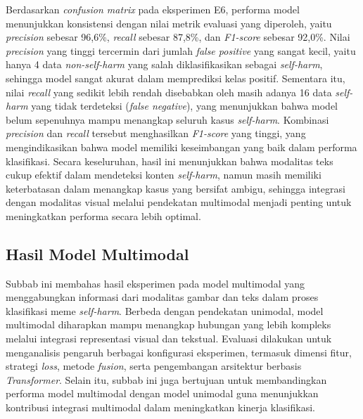 Berdasarkan \textit{confusion matrix} pada eksperimen E6, performa model menunjukkan konsistensi dengan nilai metrik evaluasi yang diperoleh, yaitu \textit{precision} sebesar 96,6\%, \textit{recall} sebesar 87,8\%, dan \textit{F1-score} sebesar 92,0\%. Nilai \textit{precision} yang tinggi tercermin dari jumlah \textit{false positive} yang sangat kecil, yaitu hanya 4 data \textit{non-self-harm} yang salah diklasifikasikan sebagai \textit{self-harm}, sehingga model sangat akurat dalam memprediksi kelas positif. Sementara itu, nilai \textit{recall} yang sedikit lebih rendah disebabkan oleh masih adanya 16 data \textit{self-harm} yang tidak terdeteksi (\textit{false negative}), yang menunjukkan bahwa model belum sepenuhnya mampu menangkap seluruh kasus \textit{self-harm}. Kombinasi \textit{precision} dan \textit{recall} tersebut menghasilkan \textit{F1-score} yang tinggi, yang mengindikasikan bahwa model memiliki keseimbangan yang baik dalam performa klasifikasi. Secara keseluruhan, hasil ini menunjukkan bahwa modalitas teks cukup efektif dalam mendeteksi konten \textit{self-harm}, namun masih memiliki keterbatasan dalam menangkap kasus yang bersifat ambigu, sehingga integrasi dengan modalitas visual melalui pendekatan multimodal menjadi penting untuk meningkatkan performa secara lebih optimal.





\subsection{Hasil Model Multimodal}
\label{IV.HasilMultimodal}
Subbab ini membahas hasil eksperimen pada model multimodal yang menggabungkan informasi dari modalitas gambar dan teks dalam proses klasifikasi meme \textit{self-harm}. Berbeda dengan pendekatan unimodal, model multimodal diharapkan mampu menangkap hubungan yang lebih kompleks melalui integrasi representasi visual dan tekstual. Evaluasi dilakukan untuk menganalisis pengaruh berbagai konfigurasi eksperimen, termasuk dimensi fitur, strategi \textit{loss}, metode \textit{fusion}, serta pengembangan arsitektur berbasis \textit{Transformer}. Selain itu, subbab ini juga bertujuan untuk membandingkan performa model multimodal dengan model unimodal guna menunjukkan kontribusi integrasi multimodal dalam meningkatkan kinerja klasifikasi.

